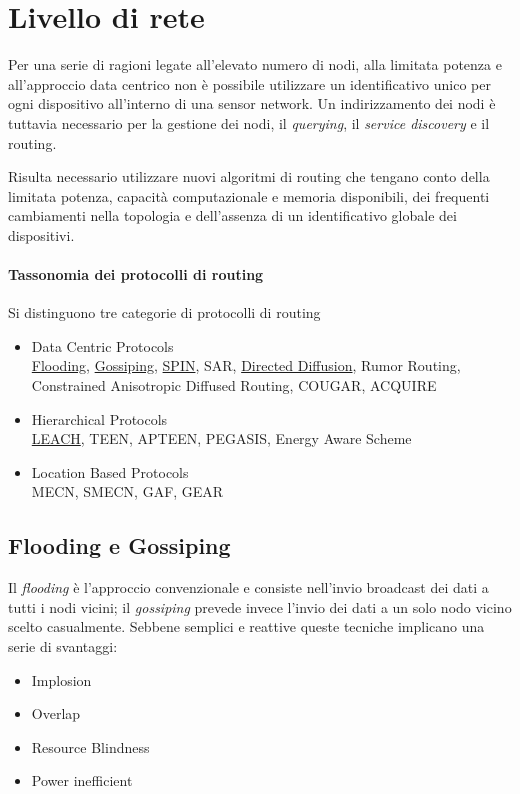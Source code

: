 \section{Livello di rete}

	Per una serie di ragioni legate all'elevato numero di nodi, alla limitata potenza e all'approccio data centrico non è possibile utilizzare un identificativo unico per ogni dispositivo all'interno di una sensor network.
	Un indirizzamento dei nodi è tuttavia necessario per la gestione dei nodi, il \emph{querying}, il \emph{service discovery} e il routing.
	
	Risulta necessario utilizzare nuovi algoritmi di routing che tengano conto della limitata potenza, capacità computazionale e memoria disponibili, dei frequenti cambiamenti nella topologia e dell'assenza di un identificativo globale dei dispositivi.
	
\paragraph{Tassonomia dei protocolli di routing}
	Si distinguono tre categorie di protocolli di routing
	\begin{itemize}
		\item Data Centric Protocols\\
			\underline{Flooding}, \underline{Gossiping}, \underline{SPIN}, SAR, \underline{Directed Diffusion}, Rumor Routing, Constrained Anisotropic Diffused Routing, COUGAR, ACQUIRE
		
		\item Hierarchical Protocols\\
			\underline{LEACH}, TEEN, APTEEN, PEGASIS, Energy Aware Scheme
		
		\item Location Based Protocols\\
			MECN, SMECN, GAF, GEAR
	\end{itemize}


\subsection{Flooding e Gossiping}

	Il \emph{flooding} è l'approccio convenzionale e consiste nell'invio broadcast dei dati a tutti i nodi vicini;
	il \emph{gossiping} prevede invece l'invio dei dati a un solo nodo vicino scelto casualmente.
	Sebbene semplici e reattive queste tecniche implicano una serie di svantaggi:
	\begin{itemize}
		\item Implosion
		\item Overlap
		\item Resource Blindness
		\item Power inefficient
	\end{itemize}

